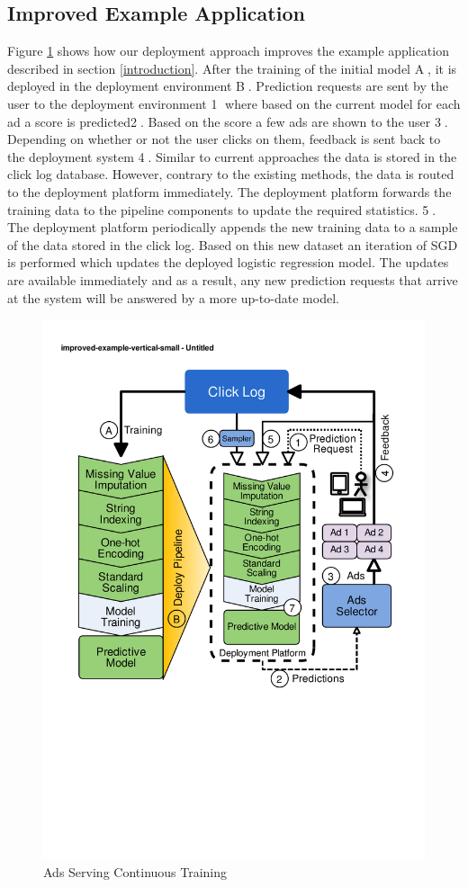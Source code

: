 \subsection{Improved Example Application}
Figure \ref{fig:improved-example} shows how our deployment approach improves the example application described in section \ref{introduction}.
After the training of the initial model \textcircled{A}, it is deployed in the deployment environment \textcircled{B}.
Prediction requests are sent by the user to the deployment environment \textcircled{1} where based on the current model for each ad a score is predicted\textcircled{2}.
Based on the score a few ads are shown to the user \textcircled{3}.
Depending on whether or not the user clicks on them, feedback is sent back to the deployment system \textcircled{4}.
Similar to current approaches the data is stored in the click log database.
However, contrary to the existing methods, the data is routed to the deployment platform immediately.
The deployment platform forwards the training data to the pipeline components to update the required statistics. \textcircled{5}.
The deployment platform periodically appends the new training data to a sample of the data stored in the click log.
Based on this new dataset an iteration of SGD is performed which updates the deployed logistic regression model.
The updates are available immediately and as a result, any new prediction requests that arrive at the system will be answered by a more up-to-date model.

\begin{figure}[t]
\centering
\includegraphics[width=\columnwidth]{../images/improved-example.pdf}
\caption{Ads Serving Continuous Training}
\label{fig:improved-example}
\end{figure}

